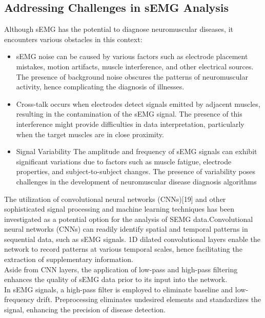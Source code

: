 \documentclass[ 12pt,a4paper,twocolumn,fleqn]{report}
\begin{document}
\subsection{Addressing Challenges in sEMG Analysis}\vskip 6pt
Although sEMG has the potential to diagnose neuromuscular diseases, it encounters various obstacles in this context:
\newpage
  \pagestyle{fancy}
\thisfancypage{%
  \setlength{\fboxsep}{20pt}\doublebox}{}
\normalsize
\begin{itemize}
    \item sEMG noise can be caused by various factors such as electrode
placement mistakes, motion artifacts, muscle interference, and
other electrical sources. The presence of background noise obscures the patterns of neuromuscular activity, hence complicating the diagnosis of illnesses.
\item Cross-talk occurs when electrodes detect signals emitted by
adjacent muscles, resulting in the contamination of the sEMG
signal. The presence of this interference might provide difficulties in data interpretation, particularly when the target muscles
are in close proximity.
\item Signal Variability The amplitude and frequency of sEMG signals can exhibit significant variations due to factors such as
muscle fatigue, electrode properties, and subject-to-subject
changes. The presence of variability poses challenges in the
development of neuromuscular disease diagnosis algorithms
\end{itemize}
The utilization of convolutional neural networks (CNNs)[19] and
other sophisticated signal processing and machine learning techniques has been investigated as a potential option for the analysis
of SEMG data.Convolutional neural networks (CNNs) can readily
identify spatial and temporal patterns in sequential data, such as
sEMG signals. 1D dilated convolutional layers enable the network
to record patterns at various temporal scales, hence facilitating the
extraction of supplementary information.\\

Aside from CNN layers, the application of low-pass and high-pass
filtering enhances the quality of sEMG data prior to its input into
the network.\\

In sEMG signals, a high-pass filter is employed to eliminate baseline and low-frequency drift. Preprocessing eliminates undesired
elements and standardizes the signal, enhancing the precision of
disease detection.\\
\end{document}
